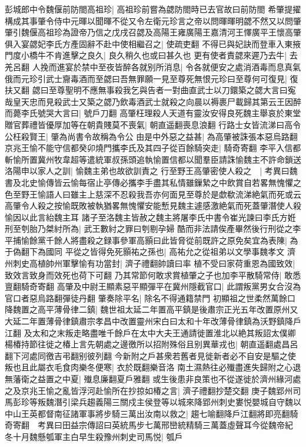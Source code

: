 彭城郎中令魏偃前防閤高祖珍|{
	高祖珍前嘗為勰防閤時已去官故曰前防閤}
希肇提擢構成其事肇令侍中元暉以聞暉不從又令左衛元珍言之帝以問暉暉明勰不然又以問肇肇引魏偃高祖珍為證帝乃信之戊戌召勰及高陽王雍廣陽王嘉清河王懌廣平王懷高肇俱入宴勰妃李氏方產固辭不赴中使相繼召之|{
	使疏吏翻}
不得已與妃訣而登車入東掖門度小橋牛不肯進擊之良久|{
	良久稍久也或曰甚久也}
更有使者責勰來遲乃去牛|{
	去羌呂翻}
人挽而進宴於禁中至夜皆醉各就别所消息|{
	令各就便安之處消酒毒而息真氣}
俄而元珍引武士齎毒酒而至勰曰吾無罪願一見至尊死無恨元珍曰至尊何可復見|{
	復扶又翻}
勰曰至尊聖明不應無事殺我乞與告者一對曲直武士以刀鐶築之勰大言曰寃哉皇天忠而見殺武士又築之勰乃飲毒酒武士就殺之向晨以褥裹尸載歸其第云王因醉而薨李氏號哭大言曰|{
	號戶刀翻}
高肇枉理殺人天道有靈汝安得良死魏主舉哀於東堂贈官葬禮皆優厚加等在朝貴賤莫不喪氣|{
	朝直遥翻喪息浪翻}
行路士女皆流涕曰高令公枉殺賢王|{
	肇為尚書令故稱為令公}
由是中外惡之益甚|{
	為高肇被誅張本惡烏路翻}
京兆王愉不能守信都癸卯燒門攜李氏及其四子從百餘騎突走|{
	騎奇寄翻}
李平入信都斬愉所置冀州牧韋超等遣統軍叔孫頭追執愉置信都以聞羣臣請誅愉魏主不許命鎖送洛陽申以家人之訓|{
	愉魏主弟也故欲訓責之}
行至野王高肇密使人殺之　|{
	考異曰魏書及北史愉傳皆云愉每宿止亭傳必攜李手盡其私情雖鏁縶之中飲賞自若畧無愧懼之色至野王愉語人曰雖主上慈深不忍殺我吾亦何面見至尊於是歔欷流涕絶氣而死或云高肇令人殺之按愉既敗被執猶畧無愧懼安能慙見魏主遽感激絶氣而死蓋肇潛使人殺愉因以此言紿魏主耳}
諸子至洛魏主皆赦之魏主將屠李氏中書令崔光諫曰李氏方姙刑至刳胎乃桀紂所為|{
	武王數紂之罪曰刳剔孕婦}
酷而非法請俟產畢然後行刑從之李平捕愉餘黨千餘人將盡殺之録事參軍高顥曰此皆脅從前既許之原免矣宜為表陳|{
	為于偽翻下為國同}
平從之皆得免死顥祐之孫也|{
	高祐允之從祖弟以文學事魏孝文}
濟州刺史高植帥州軍擊愉有功當封|{
	濟子禮翻帥讀曰率}
植不受曰家荷重恩為國致效|{
	致效言致身而效死也荷下可翻}
乃其常節何敢求賞植肇之子也加李平散騎常侍|{
	敢悉亶翻騎奇寄翻}
高肇及中尉王顯素惡平顯彈平在冀州隱截官口|{
	此謂叛黨男女合沒為官口者惡烏路翻彈徒丹翻}
肇奏除平名|{
	除名不得通籍禁門}
初顯祖之世柔然萬餘口降魏置之高平薄骨律二鎮|{
	魏世祖太延二年置高平鎮是後肅宗正光五年改置原州又大延二年置薄骨律鎮肅宗孝昌中改置靈州宋白曰太和十年改薄骨律鎮為沃野鎮降戶江翻}
及太和之末叛走略盡唯千餘戶在太中大夫王通請徙置淮北以絶其叛詔太僕卿楊椿持節往徙之椿上言先朝處之邊徼所以招附殊俗且别異華戎也|{
	朝直遥翻處昌呂翻下河處同徼吉弔翻别彼列翻}
今新附之戶甚衆若舊者見徙新者必不自安是驅之使叛也且此屬衣毛食肉樂冬便寒|{
	衣於既翻樂音洛}
南土濕熱往必殱盡進失歸附之心退無藩衛之益置之中夏|{
	殱息廉翻夏戶雅翻}
或生後患非良策也不從遂徙於濟州緣河處之及京兆王愉之亂皆浮河赴愉所在抄掠如椿之言|{
	濟子禮翻抄楚交翻}
庚子魏郢州司馬彭珍等叛魏潛引梁兵趨義陽三關戍主侯登等以城來降郢州刺史婁悦嬰城自守魏以中山王英都督南征諸軍事將步騎三萬出汝南以救之|{
	趨七喻翻降戶江翻將即亮翻騎奇寄翻　考異曰田益宗傳詔曰英統馬步七萬邢巒統精騎三萬蓋虛聲耳今從魏帝紀}
冬十月魏懸瓠軍主白早生殺豫州刺史司馬悦|{
	瓠戶}


